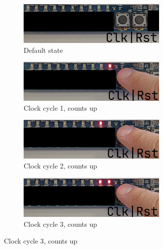 \documentclass{article}
\begin{document}
\begin{figure}[ht]
    \centering
    \begin{subfigure}[t]{1\textwidth}
        \centering
        \includegraphics[width=0.8\textwidth]{Figures/Part1_1.jpg}
        \caption{Default state}
        \label{fig:p1_1}
    \end{subfigure}

    \begin{subfigure}[t]{1\textwidth}
        \centering
        \includegraphics[width=0.8\textwidth]{Figures/Part1_2.jpg}
        \caption{Clock cycle 1, counts up}
        \label{fig:p1_2}
    \end{subfigure}

    \begin{subfigure}[t]{1\textwidth}
        \centering
        \includegraphics[width=0.8\textwidth]{Figures/Part1_3.jpg}
        \caption{Clock cycle 2, counts up}
        \label{fig:p1_3}
    \end{subfigure}

    \begin{subfigure}[t]{1\textwidth}
        \centering
        \includegraphics[width=0.8\textwidth]{Figures/Part1_4.jpg}
        \caption{Clock cycle 3, counts up}
        \label{fig:p1_4}
    \end{subfigure}

    \label{fig:p1_results}
\end{figure}
\end{document}
